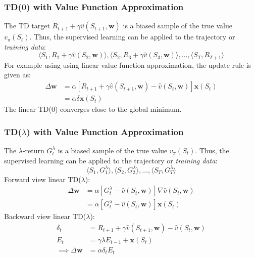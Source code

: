 \subsubsection{TD(0) with Value Function Approximation}
The TD target \(R_{t+1} + \gamma \hat{v}(S_{t+1},\mathbf{w})\) is a biased sample of the
true value \(v_{\pi}(S_t)\). Thus, the supervised learning can be applied to the trajectory
or \emph{training data}:
\[
    \langle S_1,R_2 + \gamma \hat{v}(S_2,\mathbf{w}) \rangle, \langle S_2,
    R_3 + \gamma \hat{v}(S_3,\mathbf{w}) \rangle, \dots, \langle S_T,R_{T+1} \rangle
\]
For example using using linear value function approximation, the update rule is given as:
\[
    \begin{aligned}
        \Delta \mathbf{w} &= \alpha \left[ 
            R_{t+1} + \gamma \hat{v}(S_{t+1},\mathbf{w}) - \hat{v}(S_t,\mathbf{w})
         \right] \mathbf{x}(S_t)  \\
         & = \alpha \delta \mathbf{x}(S_t)
    \end{aligned}
\]
The linear TD(0) converges close to the global minimum.

\subsubsection{TD(\(\lambda\)) with Value Function Approximation}
The \(\lambda\)-return \(G_t^{\lambda}\) is a biased sample of the true value \(v_{\pi}(S_t)\).
Thus, the supervised learning can be applied to the trajectory or \emph{training data}:
\[
    \langle S_1,G_1^{\lambda} \rangle, \langle S_2,G_2^{\lambda} \rangle, \dots, \langle S_T,
    G_T^{\lambda} \rangle
\]
Forward view linear TD(\(\lambda\)):
\[
    \begin{aligned}
        \Delta \mathbf{w} &= \alpha \left[ 
            G_t^{\lambda} - \hat{v}(S_t,\mathbf{w})
         \right]\nabla \hat{v}(S_t,\mathbf{w})  \\
         & = \alpha \left[ 
            G_t^{\lambda} - \hat{v}(S_t,\mathbf{w})
         \right]  \mathbf{x}(S_t)
    \end{aligned}
\]
Backward view linear TD(\(\lambda\)):
\[
    \begin{aligned}
        \delta _t &= R_{t+1} + \gamma \hat{v}(S_{t+1},\mathbf{w}) - \hat{v}(S_t,\mathbf{w}) \\
        E_t &= \gamma \lambda E_{t-1} + \mathbf{x}(S_t) \\
        \implies \Delta \mathbf{w} &= \alpha \delta_t E_t
    \end{aligned}
\]

